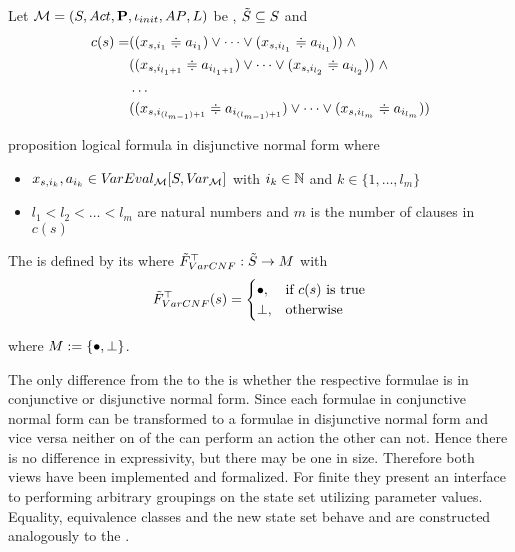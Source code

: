 \documentclass[preview]{standalone}
\begin{document}
\begin{definition}
	Let $\chgph = \chgphtuple$ be \achgphN, $\smstates \subseteq \states$ and 
	\begin{align*}
		c(s) = &((\varstate[,i_1] \eqorneq \varval_{i_1}) \lor \dots \lor (\varstate[,i_{l_1}] \eqorneq \varval_{i_{l_1}})) \; \land \\
		&((\varstate[,i_{l_1+1}] \eqorneq \varval_{i_{l_1+1}}) \lor \dots \lor (\varstate[,i_{l_2}] \eqorneq \varval_{i_{l_2}})) \; \land  \\
		&\dots \\ 
		&((\varstate[,i_{(l_{m-1})+1}] \eqorneq \varval_{i_{(l_{m-1})+1}}) \lor \dots \lor (\varstate[,i_{l_m}]  \eqorneq \varval_{i_{l_m}}))
	\end{align*}
	
	proposition logical formula in disjunctive normal form where
	\begin{itemize}
			\item $\varstate[,i_k], a_{i_k} \in \varevalimg$ with $i_k\in \natnums$ and $k \in \{1, \dots, l_m\}$
			\item $l_1 < l_2 < \dots < l_m$ are natural numbers and $m$ is the number of clauses in $c(s)$
	\end{itemize}
	The \viewN \viewparamcnf is defined by its \grpfctN \gfctparamcnf where $\gfctsubparamcnf : \smstates \to \imggrp$ with
	\[
	\gfctsubparamcnf(\state) =
	\begin{cases}
			\remelem, &\text{if } c(s) \text{ is true}\\
			\notppty, 	&\text{otherwise}
		\end{cases}
	\]
	
	where $\imggrp := \imggrpbinview$.
\end{definition}

The only difference from the \viewN \viewparamcnf to the \viewN \viewparamdnf is whether the respective formulae is in conjunctive or disjunctive normal form. Since each formulae in conjunctive normal form can be transformed to a formulae in disjunctive normal form and vice versa neither on of the \viewsN can perform an action the other can not. Hence there is no difference in expressivity, but there may be one in size. Therefore both views have been implemented and formalized. For finite \chgphsN they present an interface to performing arbitrary groupings on the state set utilizing parameter values. Equality, equivalence classes and the new state set behave and are constructed analogously to the \viewN \viewparamdnf.
\end{document}
